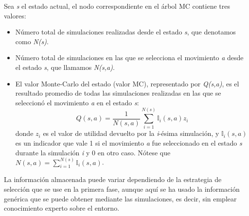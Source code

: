 Sea \textit{s} el estado actual, el nodo correspondiente en el árbol MC contiene tres valores:
\begin{itemize}
	\item Número total de simulaciones realizadas desde el estado \textit{s}, que denotamos como \textit{N(s)}.
	\item Número total de simulaciones en las que se selecciona el movimiento \textit{a} desde el estado \textit{s}, que llamamos \textit{N(s,a)}.
	\item El valor Monte-Carlo del estado (valor MC), representado por \textit{Q(s,a)}, es el resultado promedio de todas las simulaciones realizadas en las que se seleccionó el movimiento \textit{a} en el estado \textit{s}:
	\begin{displaymath}
	Q(s,a)=\frac{1}{N(s,a)}\sum_{i=1}^{N(s)}\mathds{I}_i(s,a)z_i
	\end{displaymath}
	donde $z_i$ es el valor de utilidad devuelto por la \textit{i}-ésima simulación, y $\mathds{I}_i(s,a)$ es un indicador que vale 1 si el movimiento \textit{a} fue seleccionado en el estado \textit{s} durante la simulación \textit{i} y 0 en otro caso.
	Nótese que $N(s,a) = \sum_{i=1}^{N(s)}\mathds{I}_i(s,a)$.
\end{itemize}

La información almacenada puede variar dependiendo de la estrategia de selección que se use en la primera fase, aunque aquí se ha usado la información genérica que se puede obtener mediante las simulaciones, es decir, sin emplear conocimiento experto sobre el entorno.

